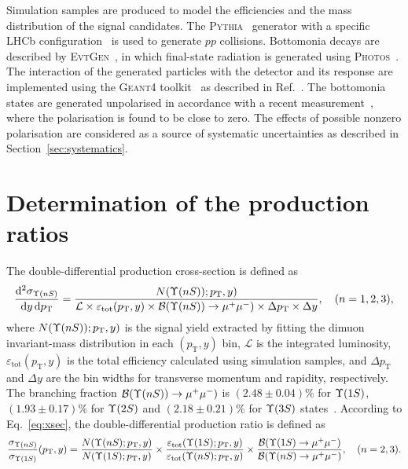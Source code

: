 \documentclass[12pt,a4paper]{article}
\def\Pmu         {\ensuremath{\upmu}\xspace}
\def\Pmu         {\ensuremath{\mu}\xspace}
\def\mumu       {{\ensuremath{\Pmu^+\Pmu^-}}\xspace}
\def\BF         {{\ensuremath{\mathcal{B}}}\xspace}
\def\BR         {\BF}
\def\to                 {\ensuremath{\rightarrow}\xspace}
\newcommand{\etot}{{\ensuremath{\varepsilon_{\mathrm{ tot}}}}\xspace}
\def\deriv {\ensuremath{\mathrm{d}}}
\def\pt         {\ensuremath{p_{\mathrm{T}}}\xspace}
\newcommand{\lum} {\ensuremath{\mathcal{L}}\xspace}
\def\evtgen     {\mbox{\textsc{EvtGen}}\xspace}
\def\geant      {\mbox{\textsc{Geant4}}\xspace}
\def\photos     {\mbox{\textsc{Photos}}\xspace}
\def\pythia     {\mbox{\textsc{Pythia}}\xspace}
\begin{document}
Simulation samples are produced to model the efficiencies and the mass distribution of the signal candidates. 
 The \pythia~\cite{Sjostrand:2006za} generator with a specific LHCb configuration~\cite{LHCb-PROC-2010-056} is used to generate $pp$ collisions. Bottomonia decays
are described by \evtgen~\cite{Lange:2001uf}, in which final-state radiation is generated using \photos~\cite{Golonka:2005pn}. The interaction of the generated particles with the detector and its
response are implemented using the \geant
toolkit~\cite{Allison:2006ve, *Agostinelli:2002hh} as described in Ref.~\cite{LHCb-PROC-2011-006}. 
The bottomonia states are generated unpolarised in accordance with a recent measurement~\cite{LHCb:2017scf}, where the polarisation is found to be close to zero. The effects of possible nonzero polarisation are considered as a source of systematic uncertainties as described in Section~\ref{sec:systematics}.
\section{Determination of the production ratios}
\label{sec:xsec}
The double-differential production cross-section is defined as
\begin{equation}
\label{eq:xsec}
  \frac{\deriv^2\sigma_{\Yn{n}}}{\deriv y\, \deriv \pt}
  = \frac{N(\Yn{n});\pt,y)}
         {\lum\times\etot(\pt,y)\times\BR(\Yn{n})\to\mumu)\times\Delta \pt \times \Delta y}, \quad(n=1,2,3),
\end{equation}
where $N(\Yn{n});\pt,y)$ is the signal yield extracted by fitting the dimuon invariant-mass distribution in each $(\pt,y)$ bin, \lum is the integrated luminosity, $\etot(\pt,y)$ is the total efficiency calculated using simulation samples, and $\Delta \pt$ and $\Delta y$ are the bin widths for transverse momentum and rapidity, respectively. 
The branching fraction \mbox{$\BR(\Yn{n})\to\mumu)$} is $(2.48\pm 0.04) \%$ for $\Upsilon{(1S)}$, $(1.93\pm 0.17) \%$ for $\Upsilon{(2S)}$ and $(2.18 \pm 0.21) \%$ for $\Upsilon{(3S)}$ states~\cite{PDG2024}. 
According to Eq.~\ref{eq:xsec}, the double-differential production ratio is defined as
\begin{equation}
  \frac{\sigma_{\Yn{n}}}{\sigma_{\Yn{1}}} (\pt, y)
  = \frac{N(\Yn{n};\pt,y)}{N(\Yn{1};\pt,y)}\times\frac{\etot(\Yn{1};\pt,y)}{\etot(\Yn{n};\pt,y)}\times
        \frac {\BR(\Yn{1}\to\mumu)}{\BR(\Yn{n}\to\mumu)}, \quad(n=2,3).
\end{equation}
\end{document}
